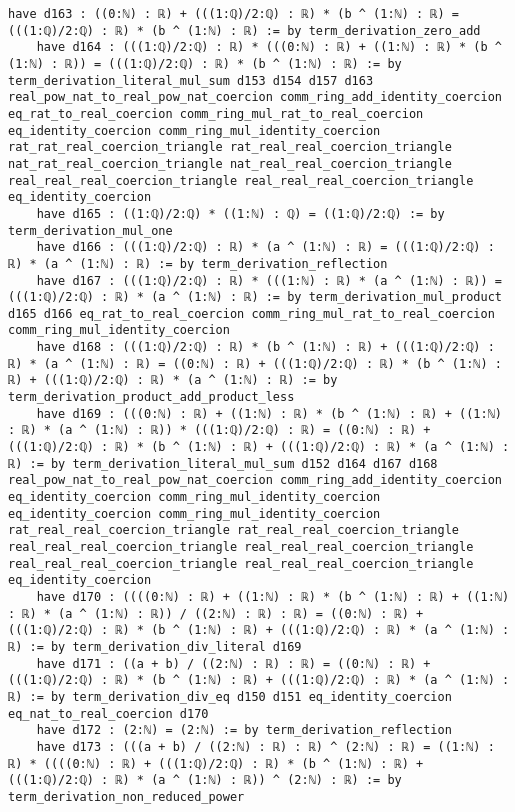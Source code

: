 \documentclass{article}
\begin{document}
\begin{tcolorbox}[colback=white!10, width=\linewidth]
\begin{lstlisting}[language=Lean4]
    have d163 : ((0:ℕ) : ℝ) + (((1:ℚ)/2:ℚ) : ℝ) * (b ^ (1:ℕ) : ℝ) = (((1:ℚ)/2:ℚ) : ℝ) * (b ^ (1:ℕ) : ℝ) := by term_derivation_zero_add
    have d164 : (((1:ℚ)/2:ℚ) : ℝ) * (((0:ℕ) : ℝ) + ((1:ℕ) : ℝ) * (b ^ (1:ℕ) : ℝ)) = (((1:ℚ)/2:ℚ) : ℝ) * (b ^ (1:ℕ) : ℝ) := by term_derivation_literal_mul_sum d153 d154 d157 d163 real_pow_nat_to_real_pow_nat_coercion comm_ring_add_identity_coercion eq_rat_to_real_coercion comm_ring_mul_rat_to_real_coercion eq_identity_coercion comm_ring_mul_identity_coercion rat_rat_real_coercion_triangle rat_real_real_coercion_triangle nat_rat_real_coercion_triangle nat_real_real_coercion_triangle real_real_real_coercion_triangle real_real_real_coercion_triangle eq_identity_coercion
    have d165 : ((1:ℚ)/2:ℚ) * ((1:ℕ) : ℚ) = ((1:ℚ)/2:ℚ) := by term_derivation_mul_one
    have d166 : (((1:ℚ)/2:ℚ) : ℝ) * (a ^ (1:ℕ) : ℝ) = (((1:ℚ)/2:ℚ) : ℝ) * (a ^ (1:ℕ) : ℝ) := by term_derivation_reflection
    have d167 : (((1:ℚ)/2:ℚ) : ℝ) * (((1:ℕ) : ℝ) * (a ^ (1:ℕ) : ℝ)) = (((1:ℚ)/2:ℚ) : ℝ) * (a ^ (1:ℕ) : ℝ) := by term_derivation_mul_product d165 d166 eq_rat_to_real_coercion comm_ring_mul_rat_to_real_coercion comm_ring_mul_identity_coercion
    have d168 : (((1:ℚ)/2:ℚ) : ℝ) * (b ^ (1:ℕ) : ℝ) + (((1:ℚ)/2:ℚ) : ℝ) * (a ^ (1:ℕ) : ℝ) = ((0:ℕ) : ℝ) + (((1:ℚ)/2:ℚ) : ℝ) * (b ^ (1:ℕ) : ℝ) + (((1:ℚ)/2:ℚ) : ℝ) * (a ^ (1:ℕ) : ℝ) := by term_derivation_product_add_product_less
    have d169 : (((0:ℕ) : ℝ) + ((1:ℕ) : ℝ) * (b ^ (1:ℕ) : ℝ) + ((1:ℕ) : ℝ) * (a ^ (1:ℕ) : ℝ)) * (((1:ℚ)/2:ℚ) : ℝ) = ((0:ℕ) : ℝ) + (((1:ℚ)/2:ℚ) : ℝ) * (b ^ (1:ℕ) : ℝ) + (((1:ℚ)/2:ℚ) : ℝ) * (a ^ (1:ℕ) : ℝ) := by term_derivation_literal_mul_sum d152 d164 d167 d168 real_pow_nat_to_real_pow_nat_coercion comm_ring_add_identity_coercion eq_identity_coercion comm_ring_mul_identity_coercion eq_identity_coercion comm_ring_mul_identity_coercion rat_real_real_coercion_triangle rat_real_real_coercion_triangle real_real_real_coercion_triangle real_real_real_coercion_triangle real_real_real_coercion_triangle real_real_real_coercion_triangle eq_identity_coercion
    have d170 : ((((0:ℕ) : ℝ) + ((1:ℕ) : ℝ) * (b ^ (1:ℕ) : ℝ) + ((1:ℕ) : ℝ) * (a ^ (1:ℕ) : ℝ)) / ((2:ℕ) : ℝ) : ℝ) = ((0:ℕ) : ℝ) + (((1:ℚ)/2:ℚ) : ℝ) * (b ^ (1:ℕ) : ℝ) + (((1:ℚ)/2:ℚ) : ℝ) * (a ^ (1:ℕ) : ℝ) := by term_derivation_div_literal d169
    have d171 : ((a + b) / ((2:ℕ) : ℝ) : ℝ) = ((0:ℕ) : ℝ) + (((1:ℚ)/2:ℚ) : ℝ) * (b ^ (1:ℕ) : ℝ) + (((1:ℚ)/2:ℚ) : ℝ) * (a ^ (1:ℕ) : ℝ) := by term_derivation_div_eq d150 d151 eq_identity_coercion eq_nat_to_real_coercion d170
    have d172 : (2:ℕ) = (2:ℕ) := by term_derivation_reflection
    have d173 : (((a + b) / ((2:ℕ) : ℝ) : ℝ) ^ (2:ℕ) : ℝ) = ((1:ℕ) : ℝ) * ((((0:ℕ) : ℝ) + (((1:ℚ)/2:ℚ) : ℝ) * (b ^ (1:ℕ) : ℝ) + (((1:ℚ)/2:ℚ) : ℝ) * (a ^ (1:ℕ) : ℝ)) ^ (2:ℕ) : ℝ) := by term_derivation_non_reduced_power

\end{lstlisting}
\end{tcolorbox}
\end{document}
